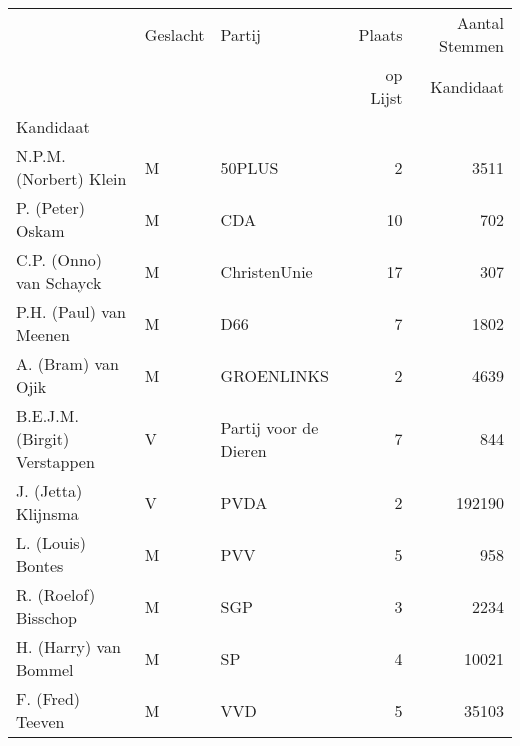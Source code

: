 \begin{tabular}{lllrr}
\toprule
{} & Geslacht &                 Partij &  Plaats   &  Aantal Stemmen  \\
 & & & op Lijst & Kandidaat\\
Kandidaat                                &          &                        &                  &                           \\
\midrule
N.P.M. (Norbert) Klein       &        M &                 50PLUS &                2 &                      3511 \\
P. (Peter) Oskam             &        M &                    CDA &               10 &                       702 \\
C.P. (Onno) van Schayck      &        M &           ChristenUnie &               17 &                       307 \\
P.H. (Paul) van Meenen       &        M &                    D66 &                7 &                      1802 \\
A. (Bram) van Ojik           &        M &             GROENLINKS &                2 &                      4639 \\
B.E.J.M. (Birgit) Verstappen &        V &  Partij voor de Dieren &                7 &                       844 \\
J. (Jetta) Klijnsma          &        V &                   PVDA &                2 &                    192190 \\
L. (Louis) Bontes            &        M &                    PVV &                5 &                       958 \\
R. (Roelof) Bisschop         &        M &                    SGP &                3 &                      2234 \\
H. (Harry) van Bommel        &        M &                     SP &                4 &                     10021 \\
F. (Fred) Teeven             &        M &                    VVD &                5 &                     35103 \\
\bottomrule
\end{tabular}

